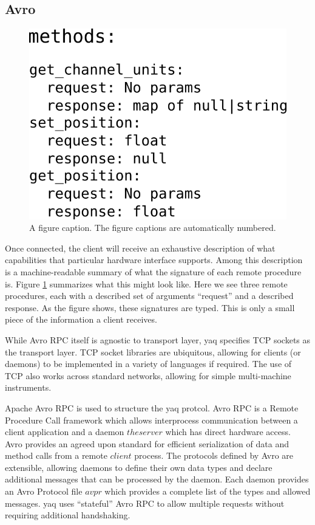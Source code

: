 \documentclass[aip, amsmath, amssymb, reprint,]{revtex4-1}
\begin{document}
\subsection{Avro}

\begin{figure}
  \includegraphics[width=\columnwidth]{./figures/methods.png}
  \caption{  \label{fig:methods} A figure caption. The figure captions are automatically numbered.}
\end{figure}

Once connected, the client will receive an exhaustive description of what capabilities that particular hardware interface supports.
Among this description is a machine-readable summary of what the signature of each remote procedure is.
Figure \ref{fig:methods} summarizes what this might look like.
Here we see three remote procedures, each with a described set of arguments ``request'' and a described response.
As the figure shows, these signatures are typed.
This is only a small piece of the information a client receives.

While Avro RPC itself is agnostic to transport layer, yaq specifies TCP sockets as the transport layer.
TCP socket libraries are ubiquitous, allowing for clients (or daemons) to be implemented in a variety of languages if required.
The use of TCP also works across standard networks, allowing for simple multi-machine instruments.

Apache Avro RPC \cite{AvroSpecification} is used to structure the yaq protcol.
Avro RPC is a Remote Procedure Call framework which allows interprocess communication between a client application and a daemon \(the server\) which has direct hardware access.
Avro provides an agreed upon standard for efficient serialization of data and method calls from a remote \(client\) process.
The protocols defined by Avro are extensible, allowing daemons to define their own data types and declare additional messages that can be processed by the daemon.
Each daemon provides an Avro Protocol file \(avpr\) which provides a complete list of the types and allowed messages.
yaq uses ``stateful'' Avro RPC to allow multiple requests without requiring additional handshaking.
\end{document}
